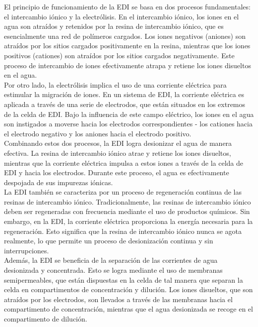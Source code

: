 El principio de funcionamiento de la EDI se basa en dos procesos fundamentales: el intercambio iónico y la electrólisis. En el intercambio iónico, los iones en el agua son atraídos y retenidos por la resina de intercambio iónico, que es esencialmente una red de polímeros cargados. Los iones negativos (aniones) son atraídos por los sitios cargados positivamente en la resina, mientras que los iones positivos (cationes) son atraídos por los sitios cargados negativamente. Este proceso de intercambio de iones efectivamente atrapa y retiene los iones disueltos en el agua. \\

Por otro lado, la electrólisis implica el uso de una corriente eléctrica para estimular la migración de iones. En un sistema de EDI, la corriente eléctrica es aplicada a través de una serie de electrodos, que están situados en los extremos de la celda de EDI. Bajo la influencia de este campo eléctrico, los iones en el agua son instigados a moverse hacia los electrodos correspondientes - los cationes hacia el electrodo negativo y los aniones hacia el electrodo positivo. \\

Combinando estos dos procesos, la EDI logra desionizar el agua de manera efectiva. La resina de intercambio iónico atrae y retiene los iones disueltos, mientras que la corriente eléctrica impulsa a estos iones a través de la celda de EDI y hacia los electrodos. Durante este proceso, el agua es efectivamente despojada de sus impurezas iónicas. \\

La EDI también se caracteriza por un proceso de regeneración continua de las resinas de intercambio iónico. Tradicionalmente, las resinas de intercambio iónico deben ser regeneradas con frecuencia mediante el uso de productos químicos. Sin embargo, en la EDI, la corriente eléctrica proporciona la energía necesaria para la regeneración. Esto significa que la resina de intercambio iónico nunca se agota realmente, lo que permite un proceso de desionización continua y sin interrupciones. \\

Además, la EDI se beneficia de la separación de las corrientes de agua desionizada y concentrada. Esto se logra mediante el uso de membranas semipermeables, que están dispuestas en la celda de tal manera que separan la celda en compartimentos de concentración y dilución. Los iones disueltos, que son atraídos por los electrodos, son llevados a través de las membranas hacia el compartimento de concentración, mientras que el agua desionizada se recoge en el compartimento de dilución. \\

